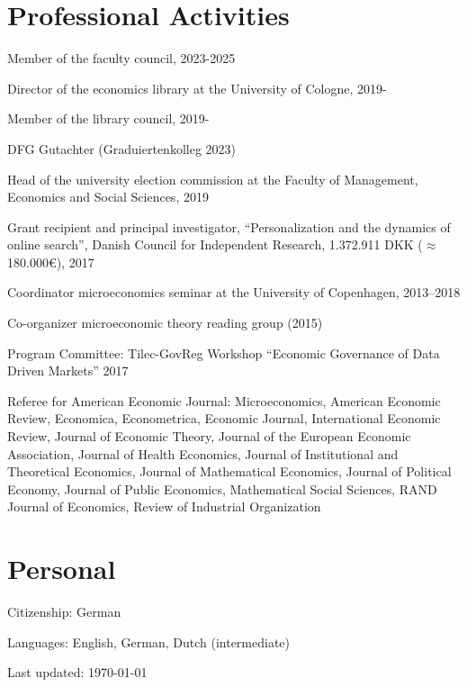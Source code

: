 \documentclass[a4paper]{article}
\def\footerlink{}
\renewenvironment{itemize}{
  \begin{list}{}{
    \setlength{\leftmargin}{1.5em}
  }
}{
  \end{list}
}
\begin{document}
\section*{Professional Activities}
\begin{itemize}
\item Member of the faculty council, 2023-2025  
\item Director of the economics library at the University of Cologne, 2019-
\item Member of the library council, 2019-
\item DFG Gutachter (Graduiertenkolleg 2023)
  \item Head of the university election commission at the Faculty of Management, Economics and Social Sciences, 2019
\item Grant recipient and principal investigator, ``Personalization and the dynamics of online search'', Danish Council for Independent Research, 1.372.911 DKK ($\approx$180.000\euro), 2017
\item Coordinator microeconomics seminar at the University of Copenhagen, 2013--2018
\item Co-organizer microeconomic theory reading group (2015)
  \item Program Committee: Tilec-GovReg Workshop ``Economic Governance of Data Driven Markets'' 2017
\item Referee for American Economic Journal: Microeconomics, American Economic Review, Economica, Econometrica, Economic Journal, International Economic Review, Journal of Economic Theory, Journal of the European Economic Association, Journal of Health Economics, Journal of Institutional and Theoretical Economics, Journal of Mathematical Economics, Journal of Political Economy, Journal of Public Economics, Mathematical Social Sciences, RAND Journal of Economics, Review of Industrial Organization
\end{itemize}


\section*{Personal}

\begin{itemize}
\item Citizenship: German
\item Languages: English, German, Dutch (intermediate)
\end{itemize}


\null\vfill %
\begin{center}
  \begin{footnotesize}
    Last updated: \today \\
    \href{\footerlink}{\texttt{\footerlink}}
  \end{footnotesize}
\end{center}
\end{document}
